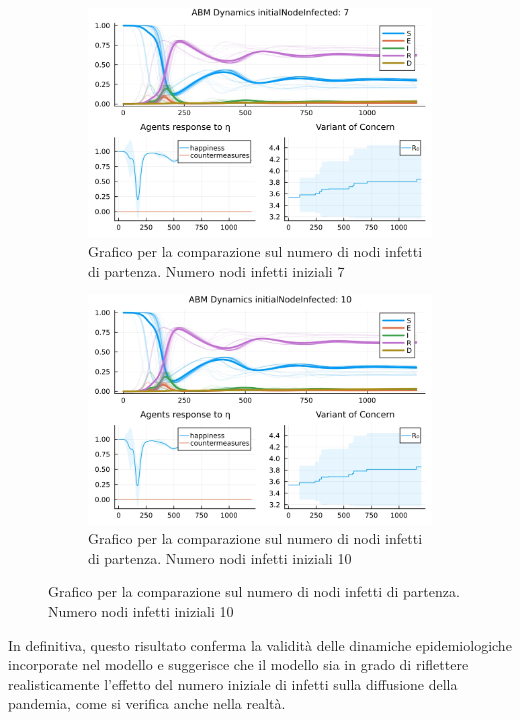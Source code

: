 \begin{figure}[H]
\begin{subfigure}[b]{0.45\textwidth}
		\includegraphics[width=\textwidth]{img/SocialNetworkABM_3_II.jpg}
		\caption{Grafico per la comparazione sul numero di nodi infetti di partenza. Numero nodi infetti iniziali 7}
		\label{fig:comparison_init_node_inf_7}
	\end{subfigure}
	\hfill
	\begin{subfigure}[b]{0.45\textwidth}
		\centering
		\includegraphics[width=\textwidth]{img/SocialNetworkABM_4_II.jpg}
		\caption{Grafico per la comparazione sul numero di nodi infetti di partenza. Numero nodi infetti iniziali 10}
		\label{fig:comparison_init_node_inf_10}
	\end{subfigure}
\end{figure}

In definitiva, questo risultato conferma la validità delle dinamiche 
epidemiologiche incorporate nel modello e suggerisce che il modello sia 
in grado di riflettere realisticamente l'effetto del numero iniziale di 
infetti sulla diffusione della pandemia, come si verifica anche nella 
realtà.

